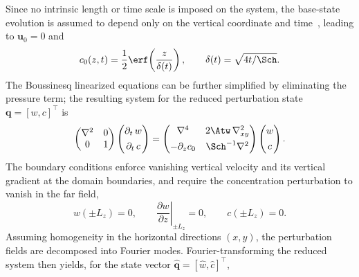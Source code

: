 Since no intrinsic length or time scale is imposed on the system, the base-state evolution is assumed to depend only on the vertical coordinate and time~\citep{prathama-pantano-2021}, leading to \(\boldsymbol{u}_0=0\) and
\begin{equation}
    \label{eq:bq_base_state}
    c_0(z,t) = \frac{1}{2}\erf\!\left(\frac{z}{\delta(t)}\right), \qquad \delta(t) = \sqrt{4t/\Sch}.
\end{equation}
The Boussinesq linearized equations can be further simplified by eliminating the pressure term; the resulting system for the reduced perturbation state \(\boldsymbol{q}=[w,c]^{\top}\) is
\begin{equation}
    \label{eq:bq_lin_continuous}
    \begin{pmatrix}
        \nabla^{2} & 0 \\
        0 & 1
    \end{pmatrix}
    \begin{pmatrix}
        \partial_t\, w \\[4pt]
        \partial_t\, c
    \end{pmatrix}
    =
    \begin{pmatrix}
        \nabla^{4} & 2\Atw\,\nabla_{xy}^{2} \\[4pt]
        -\partial_{z}c_{0} & \Sch^{-1}\nabla^{2}
    \end{pmatrix}
    \begin{pmatrix}
        w \\[4pt]
        c
    \end{pmatrix}.
\end{equation}
The boundary conditions enforce vanishing vertical velocity and its vertical gradient at the
domain boundaries, and require the concentration perturbation to vanish in the far field,
\begin{equation}
    \label{eq:bq_boundary_conditions}
    w(\pm L_z) = 0, \qquad \left.\frac{\partial w}{\partial z}\right|_{\pm L_z} = 0, \qquad
    c(\pm L_z) = 0.
\end{equation}
Assuming homogeneity in the horizontal directions \((x,y)\), the perturbation fields are decomposed into Fourier modes. Fourier-transforming the reduced system then yields, for the
state vector \(\hat{\boldsymbol{q}}=[\hat{w},\hat{c}]^{\top}\),
